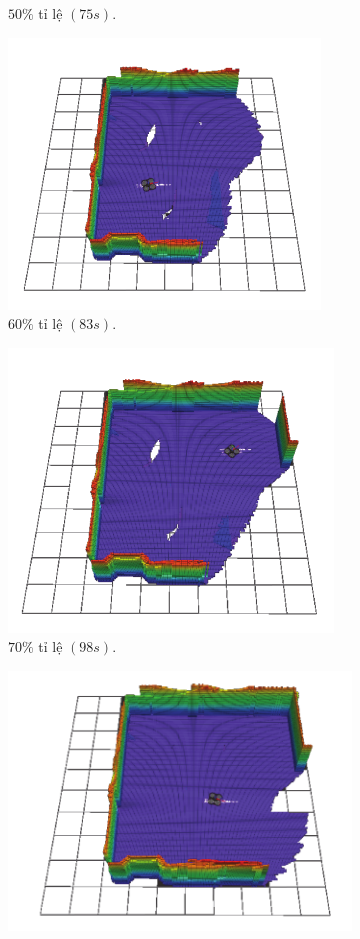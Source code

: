 \documentclass[11pt,openany]{book}
\begin{document}
\begin{algorimth}[H]
\begin{figure}[H]
\begin{subfigure}[H]{0.3\linewidth}
        \caption{{$50\%$ tỉ lệ $(75s).$}}
        \label{fig:3.13e}
    \end{subfigure}
    \begin{subfigure}[H]{0.3\linewidth}
        \centering
        \includegraphics[chiều rộng=\linewidth]{assets/3_13_f.png}
        \caption{{$60\%$ tỉ lệ $(83s).$}}
        \label{fig:3.13f}
    \end{subfigure}
    \begin{subfigure}[H]{0.3\linewidth}
        \centering
        \includegraphics[chiều rộng=\linewidth]{assets/3_13_g.png}
        \caption{{$70\%$ tỉ lệ $(98s).$}}
        \label{fig:3.13g}
    \end{subfigure}
    \begin{subfigure}[H]{0.3\linewidth}
        \centering
        \includegraphics[chiều rộng=\linewidth]{assets/3_13_h.png}

\end{subfigure}
\end{figure}
\end{algorimth}
\end{document}
